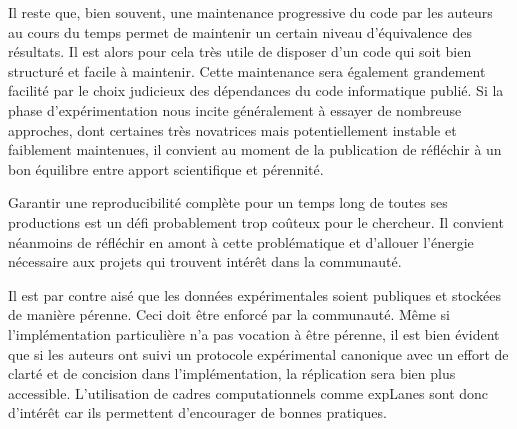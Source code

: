 Il reste que, bien souvent, une maintenance progressive du code par les auteurs au cours du temps permet de maintenir un certain niveau d'équivalence des résultats. Il est alors pour cela très utile de disposer d'un code qui soit bien structuré et facile à maintenir. Cette maintenance sera également grandement facilité par le choix judicieux des dépendances du code informatique publié. Si la phase d'expérimentation nous incite généralement à essayer de nombreuse approches, dont certaines très novatrices mais potentiellement instable et faiblement maintenues, il convient au moment de la publication de réfléchir à un bon équilibre entre apport scientifique et pérennité.

Garantir une reproducibilité complète pour un temps long de toutes ses productions est un défi probablement trop coûteux pour le chercheur. Il convient néanmoins de réfléchir en amont à cette problématique et d'allouer l'énergie nécessaire aux projets qui trouvent intérêt dans la communauté.

Il est par contre aisé que les données expérimentales soient publiques et stockées de manière pérenne. Ceci doit être enforcé par la communauté. Même si l'implémentation particulière n'a pas vocation à être pérenne, il est bien évident que si les auteurs ont suivi un protocole expérimental canonique avec un effort de clarté et de concision dans l'implémentation, la réplication sera bien plus accessible. L'utilisation de cadres computationnels comme expLanes sont donc d'intérêt car ils permettent d'encourager de bonnes pratiques.
